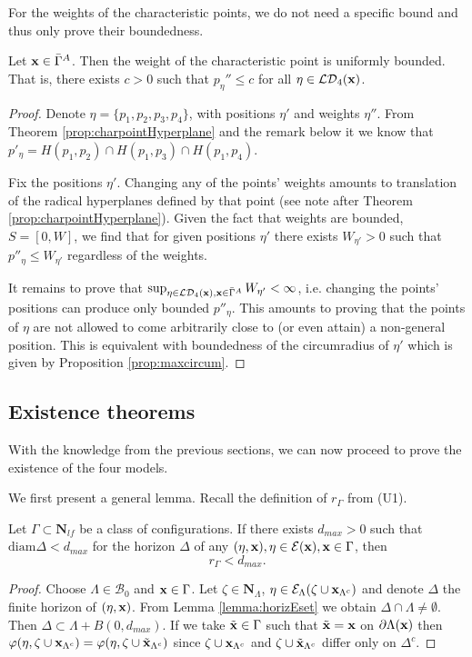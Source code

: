 \noindent For the weights of the characteristic points, we do not need a specific bound and thus only prove their boundedness.
\begin{proposition}\label{prop:maxPeta}
	Let ${\mathbf{x}} \in \bar\Gamma^A$. Then the weight of the characteristic point is uniformly bounded. That is, there exists $c>0$ such that $p_\eta'' \leq c$ for all $\eta \in \mathcal {LD}_4({\mathbf{x}})$. 
\end{proposition}
\begin{proof}
Denote $\eta=\{p_1,p_2,p_3,p_4\}$, with positions $\eta'$ and weights $\eta''$. From Theorem \ref{prop:charpointHyperplane} and the remark below it we know that $p'_\eta = H(p_1,p_2)\cap H(p_1,p_3) \cap H(p_1,p_4)$.

Fix the positions $\eta'$.  Changing any of the points' weights amounts to translation of the radical hyperplanes defined by that point (see note after Theorem \ref{prop:charpointHyperplane}). Given the fact that weights are bounded, $S=[0,W]$, we find that for given positions $\eta'$ there exists $W_{\eta'}>0$ such that $p''_\eta \leq W_{\eta'}$ regardless of the weights.

It remains to prove that $\sup_{\eta \in \mathcal {LD}_4({\mathbf{x}}),{\mathbf{x}} \in \bar\Gamma^A} W_{\eta'} < \infty$, i.e. changing the points' positions can produce only bounded $p''_\eta$. This amounts to proving that the points of $\eta$ are not allowed to come arbitrarily close to (or even attain) a non-general position. This is equivalent with boundedness of the circumradius of $\eta'$ which is given by Proposition \ref{prop:maxcircum}.
\end{proof}


\subsection{Existence theorems}\label{sec:Existence}
With the knowledge from the previous sections, we can now proceed to prove the existence of the four models.

We first present a general lemma. Recall the definition of $r_\Gamma$ from (U1). 
\begin{lemma}\label{lemma:U1}
	Let $\Gamma \subset \mathbf N_{lf}$ be a class of configurations. If there exists $d_{max}>0$ such that $\mathrm{diam}\Delta < d_{max}$ for the horizon $\Delta$ of any $(\eta,{\mathbf{x}}), \eta \in \mathcal E({\mathbf{x}}), {\mathbf{x}} \in \Gamma$, then 
	$$r_\Gamma < d_{max}.$$
\end{lemma}
\begin{proof}
	Choose $\Lambda\in \mathcal B_0$ and ${\mathbf{x}} \in \Gamma$. Let $\zeta \in \mathbf N_\Lambda$,  $\eta \in \mathcal E_\Lambda(\zeta \cup {\mathbf{x}}_{\Lambda^c})$ and denote $\Delta$ the finite horizon of $(\eta,{\mathbf{x}})$. From Lemma \ref{lemma:horizEset} we obtain $\Delta\cap\Lambda \neq \emptyset$. Then $\Delta \subset \Lambda + B(0,d_{max})$. If we take $\tilde{{\mathbf{x}}} \in \Gamma$ such that $\tilde{{\mathbf{x}}} = {\mathbf{x}}$ on $\partial\Lambda({\mathbf{x}})$ then $\varphi(\eta,\zeta \cup {\mathbf{x}}_{\Lambda^c}) = \varphi(\eta,\zeta\cup \tilde {{\mathbf{x}}}_{\Lambda^c})$ since $\zeta\cup{\mathbf{x}}_{\Lambda^c}$ and $\zeta\cup\tilde{{\mathbf{x}}}_{\Lambda^c}$ differ only on $\Delta^c$.
\end{proof}

